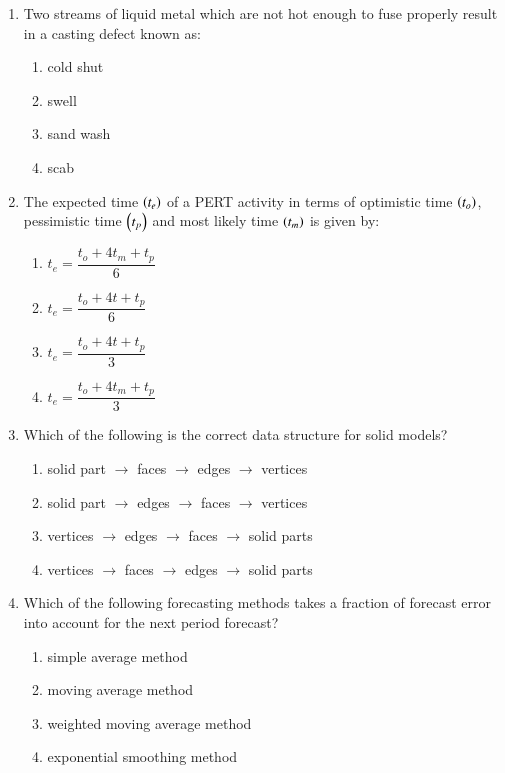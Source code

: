 \documentclass[journal]{IEEEtran}
\begin{document}
\begin{enumerate}[leftmargin=0pt]
\item Two streams of liquid metal which are not hot enough to fuse properly result in a casting defect known as:
  \begin{enumerate}
    \item cold shut
    \item swell
    \item sand wash
    \item scab
  \end{enumerate}
  \hfill{}


\item The expected time $\left(t_e\right)$ of a PERT activity in terms of optimistic time $\left(t_o\right)$, pessimistic time $\left(t_p\right)$ and most likely time $\left(t_m\right)$ is given by:
  \begin{enumerate}
    \item $t_e = \dfrac{t_o + 4 t_m + t_p}{6}$
    \item $t_e = \dfrac{t_o + 4 t + t_p}{6}$
    \item $t_e = \dfrac{t_o + 4 t + t_p}{3}$
    \item $t_e = \dfrac{t_o + 4 t_m + t_p}{3}$
  \end{enumerate}
  \hfill{}

\item Which of the following is the correct data structure for solid models?
  \begin{enumerate}
    \item solid part $\to$ faces $\to$ edges $\to$ vertices
    \item solid part $\to$ edges $\to$ faces $\to$ vertices
    \item vertices $\to$ edges $\to$ faces $\to$ solid parts
    \item vertices $\to$ faces $\to$ edges $\to$ solid parts
  \end{enumerate}
  \hfill{}



\item Which of the following forecasting methods takes a fraction of forecast error into account for the next period forecast?
  \begin{enumerate}
    \item simple average method
    \item moving average method
    \item weighted moving average method
    \item exponential smoothing method
  \end{enumerate}
  \hfill{}

\end{enumerate}
\end{document}
